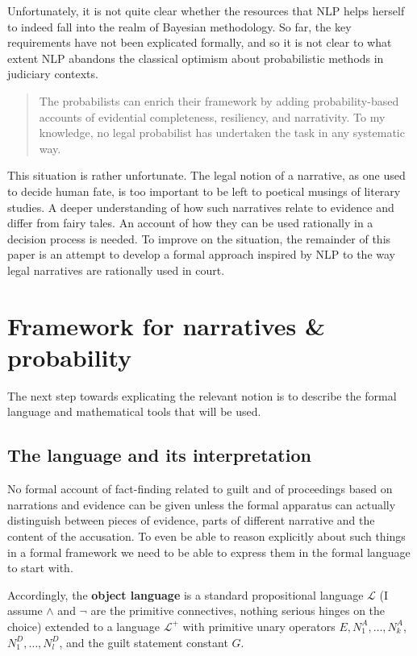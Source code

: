 \documentclass[10pt,leqno]{article}
\newcommand{\et}{\wedge}
\begin{document}
Unfortunately, it is not quite clear whether the resources that NLP helps herself to  indeed fall into the realm of Bayesian methodology. So far, the key  requirements have not been explicated formally, and so it is not clear to what extent NLP  abandons the classical optimism about probabilistic methods in judiciary contexts. 

\begin{quote}  
The probabilists can enrich their framework by adding probability-based accounts of evidential completeness, resiliency, and narrativity. To my knowledge, no legal probabilist has undertaken the task in any systematic way. \citep[75]{di2013statistics}
\end{quote}

This situation is rather unfortunate. The legal notion of a narrative, as one used to decide human fate, is too important to be left to poetical musings of literary studies.  A deeper understanding of how such narratives relate to evidence and  differ from fairy tales. An account of how they can be used rationally in a decision process is needed.  To improve on the situation, the remainder of this  paper is an attempt  to develop a formal approach inspired by NLP to  the way legal  narratives are rationally used in court. 


\section{Framework for narratives \& probability}\label{sec:framework_for_narratives}


The next step towards explicating the relevant notion is to describe the  formal language and mathematical tools that will be used. 

\subsection{The language and its interpretation}

No formal account of fact-finding related to guilt and  of proceedings based on narrations and evidence can be given unless the formal apparatus can actually distinguish between pieces of evidence,  parts of different narrative and the content of the accusation.  To even be able to reason explicitly about such things in a formal framework we need to be able to express them in the formal language to start with.

  Accordingly,  the \textbf{object language} is a standard propositional language 
$\mathcal{L}$ (I assume $\et$ and $\neg$ are the primitive connectives, nothing serious hinges on the choice) extended to a language $\mathcal{L}^{+}$ with primitive unary operators $E, N^A_1, \dots, N^A_k$, $N^D_1, \dots, N^D_l$, and the guilt statement constant $G$. 
\end{document}
